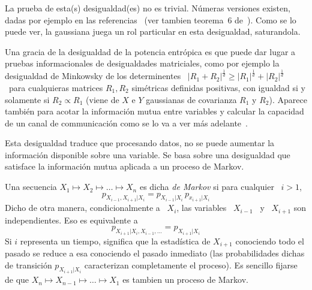 La  prueba  de  esta(s)  desigualdad(es)  no es  trivial.   N\'umeras  versiones
existen,  dadas por  ejemplo  en las  referencias~\cite{Bla65, Sta59,  ShaWea64,
  Rio07,  Rio11,  Rio17,  CovTho06,  DemCov91,  Lie78,  VerGuo06}  (ver  tambien
teorema~6 de~\cite{Lie75}).   Como se  lo puede ver,  la gaussiana juega  un rol
particular en esta desigualdad, saturandola.



Una gracia de la desigualdad de la potencia entr\'opica es que puede dar lugar a
pruebas  informacionales  de  desigualdades  matriciales, como  por  ejemplo  la
desigualdad  de Minkowsky  de los  determinentes  \ $|R_1  + R_2|^{\frac1d}  \ge
|R_1|^{\frac1d}  +  |R_2|^{\frac1d}$  \  para cualquieras  matrices  $R_1,  R_2$
sim\'etricas definidas  positivas, con igualdad  si y solamente si  $R_2 \propto
R_1$  (viene de  $X$ e  $Y$ gaussianas  de covarianza  $R_1$ y  $R_2$).  Aparece
tambi\'en  para acotar  la informaci\'on  mutua  entre variables  y calcular  la
capacidad  de  un   canal  de  communicaci\'on  como  se  lo   va  a  ver  m\'as
adelante~\cite{CovTho06, DemCov91, Rio07, Joh04}.





Esta  desigualdad  traduce  que  procesando  datos,  no  se  puede  aumentar  la
informaci\'on disponible sobre  una variable. Se basa sobre  una desigualdad que
satisface la informaci\'on mutua aplicada a un proceso de Markov.

\begin{definicion}
  Una secuencia  $X_1 \mapsto X_2 \mapsto  \ldots \mapsto X_n$ es  dicha {\it de
    Markov}   si   para  cualquier \   $i   >   1$,
  \[
  p_{X_{i-1},X_{i+1}|X_i} = p_{X_{i-1}|X_i} \, p_{x_{i+1}|X_i}
  \]
  Dicho de otra manera, condicionalmente a  \ $X_i$, las variables \ $X_{i-1}$ \
  y \ $X_{i+1}$ son independientes.  Eso es equivalente a
  \[
  p_{X_{i+1}|X_i,X_{i-1},\ldots} = p_{X_{i+1}|X_i}
  \]
  Si  $i$ representa  un tiempo,  significa  que la  estad\'istica de  $X_{i+1}$
  conociendo todo el pasado se reduce  a esa conociendo el pasado inmediato (las
  probabilidades   dichas   de   transici\'on   $p_{X_{i+1}|X_i}$   caracterizan
  completamente el  proceso).  Es sencillo  fijarse de que $X_n  \mapsto X_{n-1}
  \mapsto \ldots \mapsto X_1$ es tambien un proceso de Markov.
\end{definicion}

